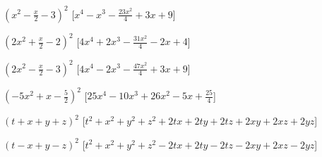 \begin{esercizio}
\begin{enumeratea}
\item \(\left(x^{2} - \frac{x}{2} - 3\right)^{2}\)
  \hfill [\(x^{4} - x^{3} - \frac{23 x^{2}}{4} + 3 x + 9\)]
\item \(\left(2 x^{2} + \frac{x}{2} - 2\right)^{2}\)
  \hfill [\(4 x^{4} + 2 x^{3} - \frac{31 x^{2}}{4} - 2 x + 4\)]
\item \(\left(2 x^{2} - \frac{x}{2} - 3\right)^{2}\)
  \hfill [\(4 x^{4} - 2 x^{3} - \frac{47 x^{2}}{4} + 3 x + 9\)]
\item \(\left(- 5 x^{2} + x - \frac{5}{2}\right)^{2}\)
  \hfill [\(25 x^{4} - 10 x^{3} + 26 x^{2} - 5 x + \frac{25}{4}\)]
\item \(\left(t+x+y+z\right)^{2}\)
  \hfill [\(t^2+x^2+y^2+z^2+2tx+2ty+2tz+2xy+2xz+2yz\)]
\item \(\left(t-x+y-z\right)^{2}\)
  \hfill [\(t^2+x^2+y^2+z^2-2tx+2ty-2tz-2xy+2xz-2yz\)]

\end{enumeratea}
\end{esercizio}
